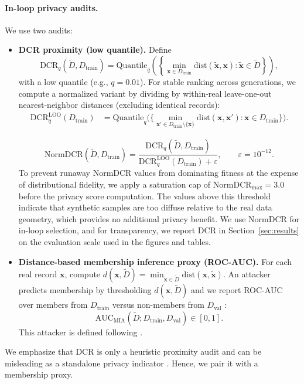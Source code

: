 \documentclass[preprint,12pt]{elsarticle}
\begin{document}
\paragraph{In-loop privacy audits.}
We use two audits:
\begin{itemize}
    \item \textbf{DCR proximity (low quantile).} Define
    \begin{equation}
    \mathrm{DCR}_{q}(\tilde{D},D_{\text{train}})=
    \mathrm{Quantile}_{q}\left(\left\{\min_{\mathbf{x}\in D_{\text{train}}}\mathrm{dist}(\tilde{\mathbf{x}},\mathbf{x}) : \tilde{\mathbf{x}}\in \tilde{D}\right\}\right),
    \end{equation}
    with a low quantile (e.g., $q=0.01$). For stable ranking across generations, we compute a normalized variant by dividing by within-real leave-one-out nearest-neighbor distances (excluding identical records):
   \begin{equation}
\begin{aligned}
\mathrm{DCR}_{q}^{\mathrm{LOO}}(D_{\text{train}})
&=
\mathrm{Quantile}_{q}\!\Big(
\Big\{
\min_{\mathbf{x}'\in D_{\text{train}}\setminus\{\mathbf{x}\}}
\mathrm{dist}(\mathbf{x},\mathbf{x}')
:\mathbf{x}\in D_{\text{train}}
\Big\}
\Big).
\end{aligned}
\end{equation}

    \begin{equation}
    \mathrm{NormDCR}(\tilde{D},D_{\text{train}})=
    \frac{\mathrm{DCR}_{q}(\tilde{D},D_{\text{train}})}{\mathrm{DCR}_{q}^{\mathrm{LOO}}(D_{\text{train}})+\varepsilon},
    \qquad \varepsilon=10^{-12}.
    \label{eq:normdcr}
    \end{equation}
    To prevent runaway NormDCR values from dominating fitness at the expense of distributional fidelity, we apply a saturation cap of $\mathrm{NormDCR}_{\max}=3.0$ before the privacy score computation. The values above this threshold indicate that synthetic samples are too diffuse relative to the real data geometry, which provides no additional privacy benefit. We use $\mathrm{NormDCR}$ for in-loop selection, and for transparency, we report DCR in Section~\ref{sec:results} on the evaluation scale used in the figures and tables.
    \item \textbf{Distance-based membership inference proxy (ROC-AUC).} For each real record $\mathbf{x}$, compute $d(\mathbf{x},\tilde{D})=\min_{\tilde{\mathbf{x}}\in \tilde{D}}\mathrm{dist}(\mathbf{x},\tilde{\mathbf{x}})$. An attacker predicts membership by thresholding $d(\mathbf{x},\tilde{D})$ and we report ROC-AUC over members from $D_{\text{train}}$ versus non-members from $D_{\text{val}}$ \cite{Hayes2019}:
    \begin{equation}
    \mathrm{AUC}_{\mathrm{MIA}}(\tilde{D};D_{\text{train}},D_{\text{val}})\in[0,1].
    \end{equation}
    This attacker is defined following \cite{Hayes2019,ZhangMalin2022}.
\end{itemize}
We emphasize that DCR is only a heuristic proximity audit and can be misleading as a standalone privacy indicator \cite{yao2025dcr_delusion}. Hence, we pair it with a membership proxy.
\end{document}

